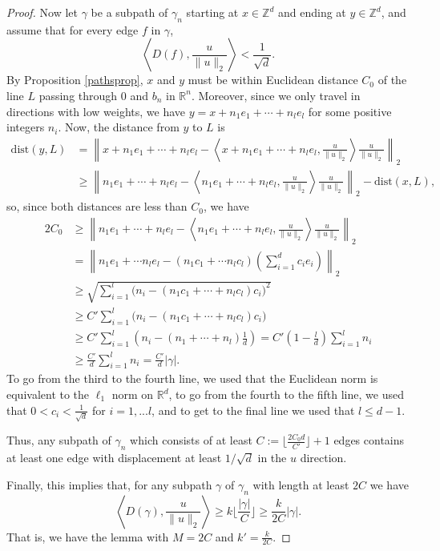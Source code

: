 \documentclass[12pt,reqno]{article}
\numberwithin{equation}{section}
\newcommand{\R}{\mathbb{R}}
\newcommand{\Z}{\mathbb{Z}}
\newcommand{\pair}[2]{\left\langle #1, #2 \right\rangle}
\begin{document}
\begin{proof}
Now let $\gamma$ be a subpath of $\gamma_n$ starting at $x \in \Z^d$ and ending at $y \in \Z^d$, and assume that
for every edge $f$ in $\gamma$,
\[ \pair{D(f)}{\frac{u}{\|u\|_2}} < \frac{1}{\sqrt{d}}. \] 
By Proposition \ref{pathsprop},
$x$ and $y$ must be within Euclidean distance $C_0$ of the line $L$ passing through $0$ and $b_n$ in $\R^n$. Moreover, since we only
travel in directions with low weights, we have $y = x + n_1 e_1 + \cdots + n_l e_l$ for some positive integers $n_i$. 
Now, the distance from $y$ to $L$ is
\begin{align*}
   \mathrm{dist}(y,L) &= \left\| x + n_1 e_1 + \cdots + n_l e_l -\pair{x + n_1 e_1 +\cdots +n_l e_l}{\frac{u}{\|u\|_2}} \frac{u}{\|u\|_2} \right\|_2 \\
   &\ge    \left\| n_1 e_1 + \cdots + n_l e_l - \pair{n_1 e_1 + \cdots + n_l e_l }{\frac{u}{\|u\|_2}} \frac{u}{\|u\|_2} \right\|_2 - \mathrm{dist}(x,L),
\end{align*}
so, since both distances are less than $C_0$, we have 
\begin{align*}
   2C_0 &\ge \left\| n_1 e_1 + \cdots + n_l e_l - \pair{n_1 e_1 + \cdots + n_l e_l }{\frac{u}{\|u\|_2}} \frac{u}{\|u\|_2} \right\|_2 \\
             &= \left\| n_1 e_1 + \cdots n_l e_l - (n_1 c_1 + \cdots n_l c_l)\left(\sum_{i=1}^d c_i e_i \right) \right\|_2 \\
             &\ge \sqrt{ \sum_{i=1}^l \big( n_i - (n_1 c_1 + \cdots + n_l c_l) c_i \big)^2} \\
             &\ge C' \sum_{i=1}^l \big( n_i - (n_1 c_1 + \cdots + n_l c_l) c_i \big) \\
             &\ge C' \sum_{i=1}^l \left( n_i - (n_1 + \cdots + n_l)\frac{1}{d} \right) = C' \left(1-\frac{l}{d}\right) \sum_{i=1}^l n_i \\
             &\ge \frac{C'}{d} \sum_{i=1}^l n_i = \frac{C'}{d} |\gamma|.
\end{align*}
To go from the third to the fourth line, we used that the Euclidean norm is equivalent to the $\ell_1$ norm on $\R^d$,
to go from the fourth to the fifth line, 
we used that $0<c_i<\frac{1}{\sqrt{d}}$ for $i=1,...l$, and to get to the final line we used that $l \le d-1$.

Thus, any subpath of $\gamma_n$ which consists of at least $C := \lfloor\frac{2 C_0 d}{ C' }\rfloor + 1$ edges contains at least one edge
with displacement at least $1/\sqrt{d}$ in the $u$ direction.

Finally, this implies that, for any subpath $\gamma$ of $\gamma_n$ with length at least $2C$ we have
\[
   \pair{D(\gamma)}{\frac{u}{\|u\|_2}} \ge k \lfloor \frac{ |\gamma| }{ C } \rfloor \ge \frac{ k }{2C} |\gamma|.
\]
That is, we have the lemma  with $M = 2C$ and $k' = \frac{k}{2C}$.


\end{proof}
\end{document}
